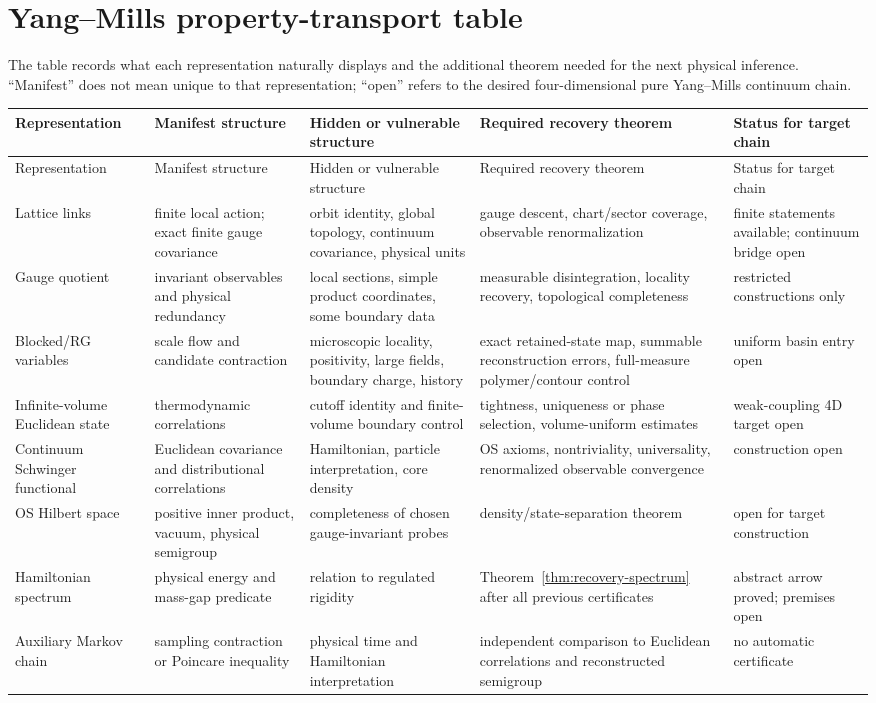 \section{Yang--Mills property-transport table}
\label{app:ymtable}

The table records what each representation naturally displays and the
additional theorem needed for the next physical inference.  ``Manifest'' does
not mean unique to that representation; ``open'' refers to the desired
four-dimensional pure Yang--Mills continuum chain.

\small
\setlength{\tabcolsep}{3pt}
\begin{longtable}{p{}p{}p{}p{}p{}}
\toprule
Representation & Manifest structure & Hidden or vulnerable structure & Required recovery theorem & Status for target chain\\
\midrule
\endfirsthead
\toprule
Representation & Manifest structure & Hidden or vulnerable structure & Required recovery theorem & Status for target chain\\
\midrule
\endhead
Lattice links & finite local action; exact finite gauge covariance & orbit identity, global topology, continuum covariance, physical units & gauge descent, chart/sector coverage, observable renormalization & finite statements available; continuum bridge open\\
Gauge quotient & invariant observables and physical redundancy & local sections, simple product coordinates, some boundary data & measurable disintegration, locality recovery, topological completeness & restricted constructions only\\
Blocked/RG variables & scale flow and candidate contraction & microscopic locality, positivity, large fields, boundary charge, history & exact retained-state map, summable reconstruction errors, full-measure polymer/contour control & uniform basin entry open\\
Infinite-volume Euclidean state & thermodynamic correlations & cutoff identity and finite-volume boundary control & tightness, uniqueness or phase selection, volume-uniform estimates & weak-coupling 4D target open\\
Continuum Schwinger functional & Euclidean covariance and distributional correlations & Hamiltonian, particle interpretation, core density & OS axioms, nontriviality, universality, renormalized observable convergence & construction open\\
OS Hilbert space & positive inner product, vacuum, physical semigroup & completeness of chosen gauge-invariant probes & density/state-separation theorem & open for target construction\\
Hamiltonian spectrum & physical energy and mass-gap predicate & relation to regulated rigidity & Theorem~\ref{thm:recovery-spectrum} after all previous certificates & abstract arrow proved; premises open\\
Auxiliary Markov chain & sampling contraction or Poincare inequality & physical time and Hamiltonian interpretation & independent comparison to Euclidean correlations and reconstructed semigroup & no automatic certificate\\
\bottomrule
\end{longtable}
